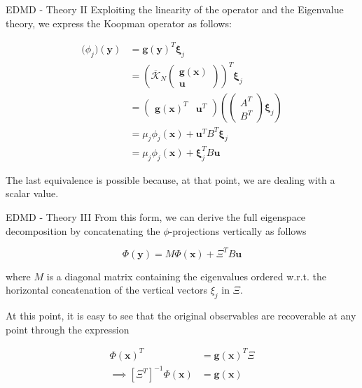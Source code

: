 \documentclass{beamer}
\begin{document}
\begin{frame}{EDMD - Theory II}
    Exploiting the linearity of the operator and the Eigenvalue theory, we express the Koopman operator as follows:
    
    \begin{align*}
        \mathbf(\phi_j)\left(\mathbf{y}\right)
        &=
        \mathbf{g}\left(\mathbf{y}\right)^T \mathbf{\xi}_j \\
        &=
        \left(\overline{\mathcal{K}}_N
        \begin{pmatrix}
            \mathbf{g}\left(\mathbf{x}\right)
            \\
            \mathbf{u}
        \end{pmatrix}\right)^T \mathbf{\xi}_j \\
        &=
        \begin{pmatrix}
            \mathbf{g}\left(\mathbf{x}\right)^T
            &
            \mathbf{u}^T
        \end{pmatrix}
        \left(
            \begin{pmatrix}
                A^T
                \\
                B^T
            \end{pmatrix}
            \mathbf{\xi}_j
        \right) \\
        &=
        \mu_j \phi_j\left(\mathbf{x}\right)
        +
        \mathbf{u}^T B^T \mathbf{\xi}_j \\
        &=
        \mu_j \phi_j\left(\mathbf{x}\right)
        +
        \mathbf{\xi}_j^T B \mathbf{u}
    \end{align*}

    The last equivalence is possible because, at that point, we are dealing with a scalar value. 
\end{frame}

\begin{frame}{EDMD - Theory III}
    From this form, we can derive the full eigenspace decomposition by concatenating the $\phi$-projections vertically as follows

    \begin{equation*}
        \Phi\left(\mathbf{y}\right) = M \Phi\left(\mathbf{x}\right) + \Xi^T B \mathbf{u}
    \end{equation*}

    where $M$ is a diagonal matrix containing the eigenvalues ordered w.r.t. the horizontal concatenation of the vertical vectors $\xi_j$ in $\Xi$.

    At this point, it is easy to see that the original observables are recoverable at any point through the expression

    \begin{align*}
        \Phi\left(\mathbf{x}\right)^T &= \mathbf{g}\left(\mathbf{x}\right)^T \Xi \\
        \implies \left[\Xi^T\right]^{-1} \Phi\left(\mathbf{x}\right) &= \mathbf{g}\left(\mathbf{x}\right)
    \end{align*}
\end{frame}
\end{document}
